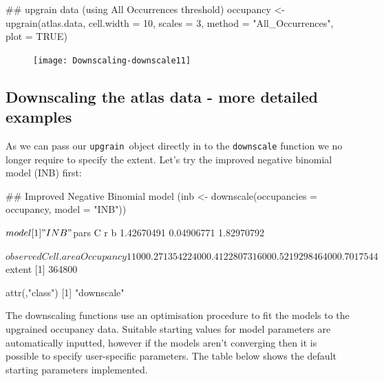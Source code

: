 \documentclass{article}[12pt, a4paper]
\begin{document}
\begin{Schunk}
\begin{Sinput}
## upgrain data (using All Occurrences threshold)
occupancy <- upgrain(atlas.data,
                     cell.width = 10,
                     scales = 3,
                     method = "All_Occurrences",
                     plot = TRUE)
\end{Sinput}
\end{Schunk}
\begin{figure}[!h]
\centering
\texttt{[image: Downscaling-downscale11]}
\end{figure}

\subsection{Downscaling the atlas data - more detailed examples}

As we can pass our \textquotesingle \texttt{upgrain}\textquotesingle\ object directly in to the \texttt{downscale} function we no longer require to specify the extent. Let’s try the improved negative binomial model (INB) first:

\begin{Schunk}
\begin{Sinput}
## Improved Negative Binomial model
(inb <- downscale(occupancies = occupancy,
                  model = "INB"))
\end{Sinput}
\begin{Soutput}
$model
[1] "INB"

$pars
         C          r          b 
1.42670491 0.04906771 1.82970792 

$observed
  Cell.area Occupancy
1       100 0.2713542
2       400 0.4122807
3      1600 0.5219298
4      6400 0.7017544

$extent
[1] 364800

attr(,"class")
[1] "downscale"

\end{Soutput}
\end{Schunk}

The downscaling functions use an optimisation procedure to fit the models to the upgrained occupancy data. Suitable starting values for model parameters are automatically inputted, however if the models aren’t converging then it is possible to specify user-specific parameters. The table below shows the default starting parameters implemented.
\end{document}
